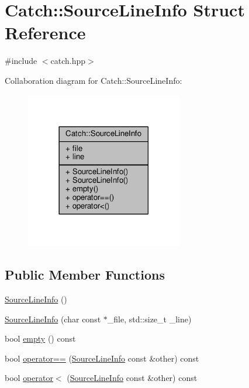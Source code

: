 \hypertarget{struct_catch_1_1_source_line_info}{\section{Catch\-:\-:Source\-Line\-Info Struct Reference}
\label{struct_catch_1_1_source_line_info}
}


{\ttfamily \#include $<$catch.\-hpp$>$}



Collaboration diagram for Catch\-:\-:Source\-Line\-Info\-:
\nopagebreak
\begin{figure}[H]
\begin{center}
\leavevmode
\includegraphics[width=194pt]{struct_catch_1_1_source_line_info__coll__graph}
\end{center}
\end{figure}
\subsection*{Public Member Functions}
\begin{DoxyCompactItemize}
\item 
\hyperlink{struct_catch_1_1_source_line_info_a9d44b2e1133794eee0bd5716424c83d6}{Source\-Line\-Info} ()
\item 
\hyperlink{struct_catch_1_1_source_line_info_a6218cb890337d37f708ea94063958940}{Source\-Line\-Info} (char const $\ast$\-\_\-file, std\-::size\-\_\-t \-\_\-line)
\item 
bool \hyperlink{struct_catch_1_1_source_line_info_a9a25ffc0640d1a3dd0c9b7e5fcbba7b9}{empty} () const 
\item 
bool \hyperlink{struct_catch_1_1_source_line_info_af0854821b1abfda52796ef0f1294b050}{operator==} (\hyperlink{struct_catch_1_1_source_line_info}{Source\-Line\-Info} const \&other) const 
\item 
bool \hyperlink{struct_catch_1_1_source_line_info_a581c02d683808232168bfc2e775c3554}{operator$<$} (\hyperlink{struct_catch_1_1_source_line_info}{Source\-Line\-Info} const \&other) const 
\end{DoxyCompactItemize}
